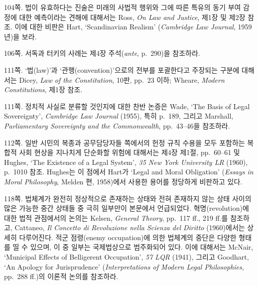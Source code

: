 {\noteentry 104쪽.  법이 유효하다는
진술은 미래의 사법적 행위와 그에 따른 특유의 동기 부여 감정에 대한
예측이라는 견해에 대해서는 Ross, \emph{On Law and Justice}, 제1장 및
제2장 참조. 이에 대한 비판은 Hart, `Scandinavian Realism'
(\emph{Cambridge Law Journal}, 1959년)을 보라.

\noteentry 106쪽.  서독과 터키의 사례는 제4장 주석(\emph{ante}, p.~290)을
참조하라.

\noteentry 111쪽.  ‘법(law)’과 ‘관행(convention)’으로의 전부를
포괄한다고 주장되는 구분에 대해서는 Dicey, \emph{Law of the
Constitution}, 10판, pp.~23 이하; Wheare, \emph{Modern Constitutions},
제1장 참조.

\noteentry 111쪽.  정치적
사실로 분류할 것인지에 대한 찬반 논증은 Wade, `The Basis of Legal
Sovereignty', \emph{Cambridge Law Journal} (1955), 특히 p.~189, 그리고
Marshall, \emph{Parliamentary Sovereignty and the Commonwealth},
pp.~43--46을 참조하라.

\noteentry 112쪽.  일반 시민의 복종과 공무담당자들 쪽에서의 헌정 규칙 수용을
모두 포함하는 복합적 사회 현상을 지나치게 단순화할 위험에 대해서는 제4장
제1절, pp.~60--61 및 Hughes, `The Existence of a Legal System', \emph{35
New York University LR} (1960), p.~1010 참조. Hughes는 이 점에서 Hart가
`Legal and Moral Obligation' (\emph{Essays in Moral Philosophy}, Melden
편, 1958)에서 사용한 용어를 정당하게 비판하고 있다.

\noteentry 118쪽.  법체계가 완전히 정상적으로 존재하는 상태와 전혀 존재하지 않는 상태
사이의 많은 가능한 중간 상태들 중 극히 일부만이 본문에서 언급되었다.
혁명(revolution)에 대한 법적 관점에서의 논의는 Kelsen, \emph{General
Theory}, pp.~117 ff., 219 ff.를 참조하고, Cattaneo, \emph{Il Concetto di
Revoluzione nella Scienza del Diritto} (1960)에서는 상세히 다루어진다.
적군 점령(enemy occupation)에 의한 법체계의 중단은 다양한 형태를 띨 수
있으며, 이 중 일부는 국제법상으로 범주화되어 있다. 이에 대해서는 McNair,
`Municipal Effects of Belligerent Occupation', \emph{57 LQR} (1941),
그리고 Goodhart, `An Apology for Jurisprudence' (\emph{Interpretations
of Modern Legal Philosophies}, pp.~288 ff.)의 이론적 논의를 참조하라.

}

